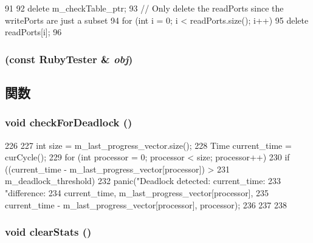 \begin{DoxyCode}
91 {
92     delete m_checkTable_ptr;
93     // Only delete the readPorts since the writePorts are just a subset
94     for (int i = 0; i < readPorts.size(); i++)
95         delete readPorts[i];
96 }
\end{DoxyCode}
\hypertarget{classRubyTester_a48ff36f9d0f5c4edd6ef8231861867d6}{
\subsubsection[{RubyTester}]{ (const {\bf RubyTester} \& {\em obj})}}
\label{classRubyTester_a48ff36f9d0f5c4edd6ef8231861867d6}


\subsection{関数}
\hypertarget{classRubyTester_a514b854b1aebca4ab64690855d9588b9}{
\subsubsection[{checkForDeadlock}]{\setlength{\rightskip}{0pt plus 5cm}void checkForDeadlock ()}}
\label{classRubyTester_a514b854b1aebca4ab64690855d9588b9}



\begin{DoxyCode}
226 {
227     int size = m_last_progress_vector.size();
228     Time current_time = curCycle();
229     for (int processor = 0; processor < size; processor++) {
230         if ((current_time - m_last_progress_vector[processor]) >
231                 m_deadlock_threshold) {
232             panic("Deadlock detected: current_time: %
233                   "difference:  %
234                   current_time, m_last_progress_vector[processor],
235                   current_time - m_last_progress_vector[processor], processor);
236         }
237     }
238 }
\end{DoxyCode}
\hypertarget{classRubyTester_ac7ec7476159db4e2bb0372e30010fc9e}{
\subsubsection[{clearStats}]{\setlength{\rightskip}{0pt plus 5cm}void clearStats ()}}
\label{classRubyTester_ac7ec7476159db4e2bb0372e30010fc9e}



